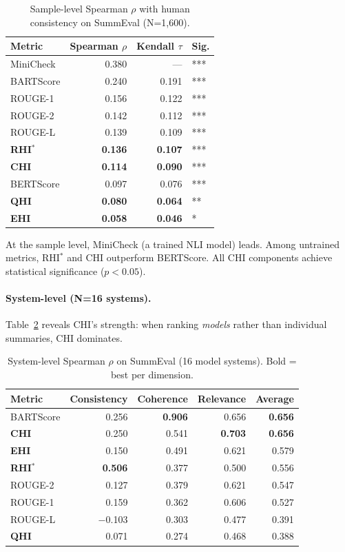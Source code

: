 \documentclass[11pt]{article}
\begin{document}
\begin{table}[h]
\centering
\caption{Sample-level Spearman $\rho$ with human consistency on SummEval (N=1,600).}
\label{tab:summeval_sample}
\begin{tabular}{lrrl}
\toprule
\textbf{Metric} & \textbf{Spearman $\rho$} & \textbf{Kendall $\tau$} & \textbf{Sig.} \\
\midrule
MiniCheck & 0.380 & --- & *** \\
BARTScore & 0.240 & 0.191 & *** \\
ROUGE-1 & 0.156 & 0.122 & *** \\
ROUGE-2 & 0.142 & 0.112 & *** \\
ROUGE-L & 0.139 & 0.109 & *** \\
\textbf{RHI$^*$} & \textbf{0.136} & \textbf{0.107} & *** \\
\textbf{CHI} & \textbf{0.114} & \textbf{0.090} & *** \\
BERTScore & 0.097 & 0.076 & *** \\
\textbf{QHI} & \textbf{0.080} & \textbf{0.064} & ** \\
\textbf{EHI} & \textbf{0.058} & \textbf{0.046} & * \\
\bottomrule
\end{tabular}
\end{table}

At the sample level, MiniCheck (a trained NLI model) leads. Among untrained metrics, RHI$^*$ and CHI outperform BERTScore. All CHI components achieve statistical significance ($p < 0.05$).

\paragraph{System-level (N=16 systems).} Table~\ref{tab:summeval_system} reveals CHI's strength: when ranking \emph{models} rather than individual summaries, CHI dominates.

\begin{table}[h]
\centering
\caption{System-level Spearman $\rho$ on SummEval (16 model systems). Bold = best per dimension.}
\label{tab:summeval_system}
\begin{tabular}{lrrrr}
\toprule
\textbf{Metric} & \textbf{Consistency} & \textbf{Coherence} & \textbf{Relevance} & \textbf{Average} \\
\midrule
BARTScore & 0.256 & \textbf{0.906} & 0.656 & \textbf{0.656} \\
\textbf{CHI} & 0.250 & 0.541 & \textbf{0.703} & \textbf{0.656} \\
\textbf{EHI} & 0.150 & 0.491 & 0.621 & 0.579 \\
\textbf{RHI$^*$} & \textbf{0.506} & 0.377 & 0.500 & 0.556 \\
ROUGE-2 & 0.127 & 0.379 & 0.621 & 0.547 \\
ROUGE-1 & 0.159 & 0.362 & 0.606 & 0.527 \\
ROUGE-L & $-$0.103 & 0.303 & 0.477 & 0.391 \\
\textbf{QHI} & 0.071 & 0.274 & 0.468 & 0.388 \\
\bottomrule
\end{tabular}
\end{table}
\end{document}
